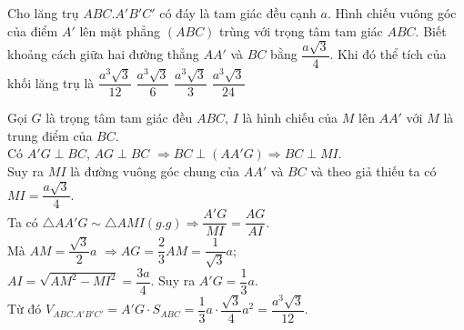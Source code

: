 \begin{ex}%
Cho lăng trụ $ABC.A'B'C'$ có đáy là tam giác đều cạnh $a$. Hình chiếu vuông góc của điểm $A'$ lên mặt phẳng $(ABC)$ trùng với trọng tâm tam giác $ABC$. Biết khoảng cách giữa hai đường thẳng $AA'$ và $BC$ bằng $\dfrac{a\sqrt{3}}{4}$. Khi đó thể tích của khối lăng trụ là
\choice
{\True $\dfrac{a^3\sqrt{3}}{12}$}
{$\dfrac{a^3\sqrt{3}}{6}$}
{$\dfrac{a^3\sqrt{3}}{3}$}
{$\dfrac{a^3\sqrt{3}}{24}$}
\loigiai
{
\immini
{
	Gọi $G$ là trọng tâm tam giác đều $ABC$, $I$ là hình chiếu của $M$ lên $AA'$ với $M$ là trung điểm của $BC$.\\
	Có $A'G\perp BC$, $AG\perp BC$
	$\Rightarrow BC\perp (AA'G)\Rightarrow BC\perp MI$.\\
	Suy ra $MI$ là đường vuông góc chung của $AA'$ và $BC$ và theo giả thiếu ta có $MI=\dfrac{a\sqrt{3}}{4}$.\\
	Ta có $\triangle AA'G\sim \triangle AMI (g.g)\Rightarrow \dfrac{A'G}{MI}=\dfrac{AG}{AI}$.\\
	Mà $AM=\dfrac{\sqrt{3}}{2}a$ $\Rightarrow AG=\dfrac{2}{3}AM=\dfrac{1}{\sqrt{3}}a$;\\
    $AI=\sqrt{AM^2-MI^2}=\dfrac{3a}{4}$.
	Suy ra $A'G=\dfrac{1}{3}a$.\\
	Từ đó $V_{ABC.A'B'C'}=A'G\cdot S_{ABC}=\dfrac{1}{3}a\cdot \dfrac{\sqrt{3}}{4}a^2=\dfrac{a^3\sqrt{3}}{12}$.
}
{
}	
}
\end{ex}


